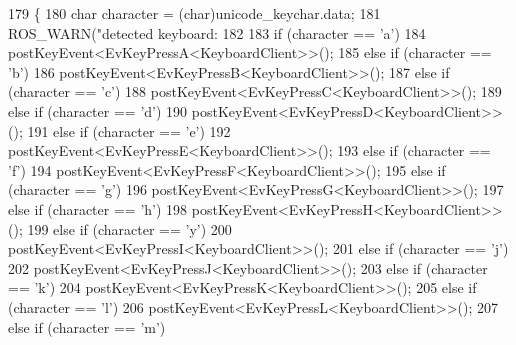 \begin{DoxyCode}
179         \{
180                 \textcolor{keywordtype}{char} character = (char)unicode\_keychar.data;
181                 ROS\_WARN(\textcolor{stringliteral}{"detected keyboard: %
182 
183                 \textcolor{keywordflow}{if} (character == \textcolor{charliteral}{'a'})
184                         postKeyEvent<EvKeyPressA<KeyboardClient>>();
185                 \textcolor{keywordflow}{else} \textcolor{keywordflow}{if} (character == \textcolor{charliteral}{'b'})
186                         postKeyEvent<EvKeyPressB<KeyboardClient>>();
187                 \textcolor{keywordflow}{else} \textcolor{keywordflow}{if} (character == \textcolor{charliteral}{'c'})
188                         postKeyEvent<EvKeyPressC<KeyboardClient>>();
189                 \textcolor{keywordflow}{else} \textcolor{keywordflow}{if} (character == \textcolor{charliteral}{'d'})
190                         postKeyEvent<EvKeyPressD<KeyboardClient>>();
191                 \textcolor{keywordflow}{else} \textcolor{keywordflow}{if} (character == \textcolor{charliteral}{'e'})
192                         postKeyEvent<EvKeyPressE<KeyboardClient>>();
193                 \textcolor{keywordflow}{else} \textcolor{keywordflow}{if} (character == \textcolor{charliteral}{'f'})
194                         postKeyEvent<EvKeyPressF<KeyboardClient>>();
195                 \textcolor{keywordflow}{else} \textcolor{keywordflow}{if} (character == \textcolor{charliteral}{'g'})
196                         postKeyEvent<EvKeyPressG<KeyboardClient>>();
197                 \textcolor{keywordflow}{else} \textcolor{keywordflow}{if} (character == \textcolor{charliteral}{'h'})
198                         postKeyEvent<EvKeyPressH<KeyboardClient>>();
199                 \textcolor{keywordflow}{else} \textcolor{keywordflow}{if} (character == \textcolor{charliteral}{'y'})
200                         postKeyEvent<EvKeyPressI<KeyboardClient>>();
201                 \textcolor{keywordflow}{else} \textcolor{keywordflow}{if} (character == \textcolor{charliteral}{'j'})
202                         postKeyEvent<EvKeyPressJ<KeyboardClient>>();
203                 \textcolor{keywordflow}{else} \textcolor{keywordflow}{if} (character == \textcolor{charliteral}{'k'})
204                         postKeyEvent<EvKeyPressK<KeyboardClient>>();
205                 \textcolor{keywordflow}{else} \textcolor{keywordflow}{if} (character == \textcolor{charliteral}{'l'})
206                         postKeyEvent<EvKeyPressL<KeyboardClient>>();
207                 \textcolor{keywordflow}{else} \textcolor{keywordflow}{if} (character == \textcolor{charliteral}{'m'})
}
\end{DoxyCode}
